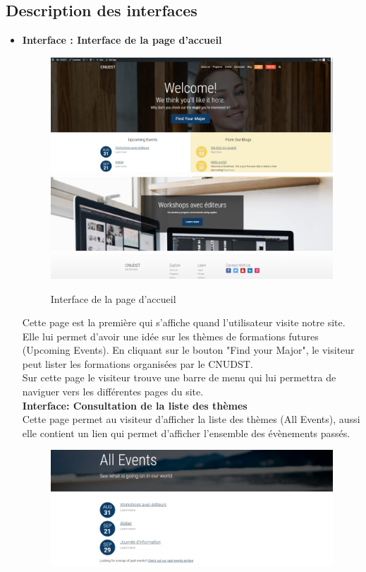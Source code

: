 \subsection{Description des interfaces}
\begin{itemize}
	\item \textbf{Interface : Interface de la page d'accueil}
	\newpage
	\begin{figure}[!h]
		\centering
		{\includegraphics[width=1.05\textwidth]{D) IMAGES/them.png}}
		{\includegraphics[width=1.05\textwidth]{D) IMAGES/them2.png}}
		\caption{Interface de la page d'accueil}
		\label{Org}
	\end{figure}
	Cette page est la première qui s'affiche quand l'utilisateur visite notre site. Elle lui permet d'avoir une idée sur les thèmes de formations futures (Upcoming Events).
	En cliquant sur le bouton "Find your Major", le visiteur peut lister les formations organisées par le CNUDST.\\
	Sur cette page le visiteur trouve une barre de menu qui lui permettra de naviguer vers les différentes pages du site.\\
	\newpage
	\textbf{Interface: Consultation de la liste des thèmes}\\
	Cette page permet au visiteur d'afficher la liste des thèmes (All Events), aussi elle contient un lien qui permet d'afficher l'ensemble des évènements passés.\\
	\begin{figure}[!h]
		\centering
		{\includegraphics[width=1.05\textwidth]{D) IMAGES/listevent.png}}

\end{figure}
\end{itemize}
